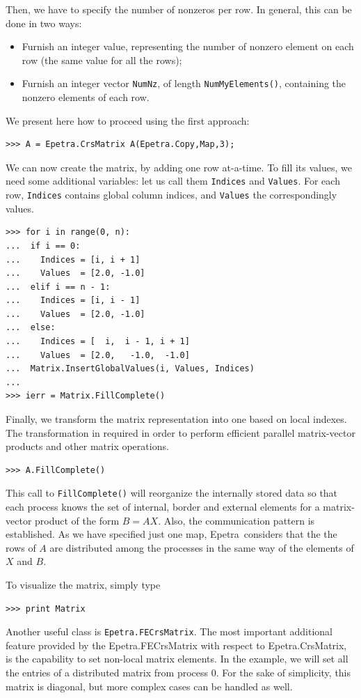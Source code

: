 \documentclass[10pt,relax]{SANDreport}
\newcommand{\epetra}{{Epetra}}
\begin{document}
Then, we have to specify the number
of nonzeros per row. In general, this can be done in two ways:
\begin{itemize}
\item Furnish an integer value, representing the number of nonzero
  element on each row (the same value for all the rows);
\item Furnish an integer vector \verb!NumNz!, of length
  \verb!NumMyElements()!, containing the nonzero elements of each row.
\end{itemize}

We present here how to proceed using the first approach:
\begin{verbatim}
>>> A = Epetra.CrsMatrix A(Epetra.Copy,Map,3);
\end{verbatim}
We can now create the matrix, by adding one row at-a-time.
To fill its values, we
need some additional variables: let us call them \verb!Indices! and
\verb!Values!. For each row, \verb!Indices! contains global column
indices, and \verb!Values! the correspondingly values.
\begin{verbatim}
>>> for i in range(0, n):
...  if i == 0:
...    Indices = [i, i + 1]
...    Values  = [2.0, -1.0]
...  elif i == n - 1:
...    Indices = [i, i - 1]
...    Values  = [2.0, -1.0]
...  else:
...    Indices = [  i,  i - 1, i + 1]
...    Values  = [2.0,   -1.0,  -1.0]
...  Matrix.InsertGlobalValues(i, Values, Indices)
...
>>> ierr = Matrix.FillComplete()
\end{verbatim}
Finally, we
transform the matrix representation into one based on local indexes. The
transformation in required in order to perform efficient parallel
matrix-vector products and other matrix operations.
\begin{verbatim}
>>> A.FillComplete()
\end{verbatim}
This call to \verb!FillComplete()! will reorganize the internally stored
data so that each process knows the set of internal, border and external
elements for a matrix-vector product of the form $B = AX$. Also, the
communication pattern is established. As we have specified just one map,
\epetra\ considers that the the rows of $A$ are distributed among the
processes in the same way of the elements of $X$ and $B$.

To visualize the matrix, simply type
\begin{verbatim}
>>> print Matrix
\end{verbatim}

Another useful class is {\tt Epetra.FECrsMatrix}.
The most important additional feature provided by the
Epetra.FECrsMatrix with respect to Epetra.CrsMatrix, is the capability
to set non-local matrix elements. In the
example, we will set all the entries of a distributed matrix from
process 0. For the sake of simplicity, this matrix is diagonal, but more
complex cases can be handled as well.
\end{document}
